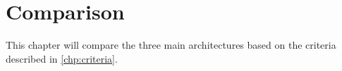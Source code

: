 \chapter{Comparison}
\label{chp:comparison}

This chapter will compare the three main architectures based on the criteria described in \ref{chp:criteria}.

